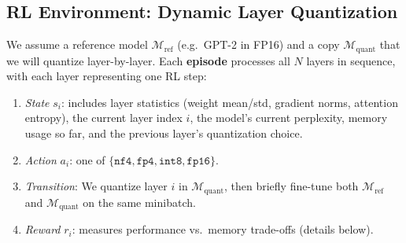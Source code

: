 \documentclass{article}
\begin{document}
	\subsection{RL Environment: Dynamic Layer Quantization}
	We assume a reference model $\mathcal{M}_{\text{ref}}$ (e.g.\ GPT-2 in FP16) and a copy $\mathcal{M}_{\text{quant}}$ that we will quantize layer-by-layer. Each \textbf{episode} processes all $N$ layers in sequence, with each layer representing one RL step:
	\begin{enumerate}
		\item \textit{State} $s_i$: includes layer statistics (weight mean/std, gradient norms, attention entropy), the current layer index $i$, the model’s current perplexity, memory usage so far, and the previous layer’s quantization choice.
		\item \textit{Action} $a_i$: one of $\{\texttt{nf4}, \texttt{fp4}, \texttt{int8}, \texttt{fp16}\}$.
		\item \textit{Transition}: We quantize layer $i$ in $\mathcal{M}_{\text{quant}}$, then briefly fine-tune both $\mathcal{M}_{\text{ref}}$ and $\mathcal{M}_{\text{quant}}$ on the same minibatch.
		\item \textit{Reward} $r_i$: measures performance vs.\ memory trade-offs (details below).
	\end{enumerate}
	
\end{document}
